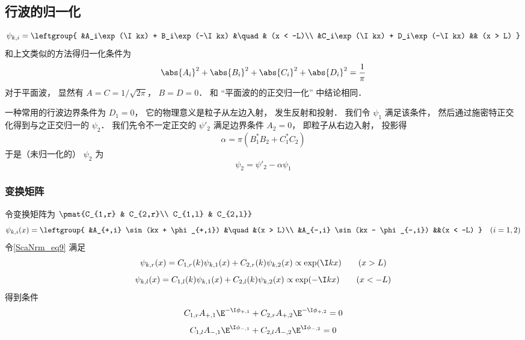 \subsection{行波的归一化}

\begin{equation}
\psi_{k,i} = \leftgroup{
    &A_i\exp(\I kx) + B_i\exp(-\I kx) &\quad& (x < -L)\\
    &C_i\exp(\I kx) + D_i\exp(-\I kx) && (x > L)
}
\end{equation}
和上文类似的方法得归一化条件为
\begin{equation}
\abs{A_i}^2 + \abs{B_i}^2 + \abs{C_i}^2 + \abs{D_i}^2= \frac{1}{\pi}
\end{equation}
对于平面波， 显然有 $A = C = 1/\sqrt{2\pi}$， $B = D = 0$． 和 “平面波的的正交归一化” 中结论相同．

一种常用的行波边界条件为 $D_1 = 0$， 它的物理意义是粒子从左边入射， 发生反射和投射． 我们令 $\psi_1$ 满足该条件， 然后通过施密特正交化得到与之正交归一的 $\psi_2$． 我们先令不一定正交的 $\psi'_2$ 满足边界条件 $A_2 = 0$， 即粒子从右边入射， 投影得
\begin{equation}
\alpha = \pi (B_1^* B_2 + C_1^*C_2)
\end{equation}
于是（未归一化的） $\psi_2$ 为
\begin{equation}
\psi_2 = \psi'_2 - \alpha \psi_1
\end{equation}

\subsubsection{变换矩阵}
令变换矩阵为 $\pmat{C_{1,r} & C_{2,r}\\ C_{1,l} & C_{2,l}}$
\begin{equation}
\psi_{k,i}(x) = \leftgroup{
    &A_{+,i} \sin(kx + \phi_{+,i}) &\quad &(x > L)\\
    &A_{-,i} \sin(kx - \phi_{-,i}) &&(x < -L)
} \quad (i = 1,2)
\end{equation}
令\autoref{ScaNrm_eq9} 满足
\begin{equation}
\psi_{k,r}(x) = C_{1,r}(k)\psi_{k,1}(x) + C_{2,r}(k)\psi_{k,2}(x) \propto \exp(\I kx) \qquad (x > L)
\end{equation}
\begin{equation}
\psi_{k,l}(x) = C_{1,l}(k)\psi_{k,1}(x) + C_{2,l}(k)\psi_{k,2}(x) \propto \exp(-\I kx) \qquad (x < -L)
\end{equation}
得到条件
\begin{equation}
C_{1,r}A_{+,1}\E^{-\I\phi_{+,1}} + C_{2,r}A_{+,2}\E^{-\I\phi_{+,2}} = 0
\end{equation}
\begin{equation}
C_{1,l}A_{-,1}\E^{\I\phi_{-,1}} + C_{2,l}A_{-,2}\E^{\I\phi_{-,2}} = 0
\end{equation}
